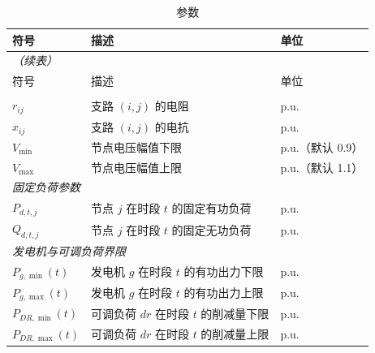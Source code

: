 \documentclass[12pt,a4paper]{article}
\begin{document}
\begin{longtable}{p{3cm}p{6cm}p{4cm}}
\caption{参数}\label{tab:parameters} \\
\toprule
符号 & 描述 & 单位 \\
\midrule
\endfirsthead
\multicolumn{3}{l}{\small\itshape（续表）} \\
\toprule
符号 & 描述 & 单位 \\
\midrule
\endhead
\bottomrule
\endlastfoot
\multicolumn{3}{l}{\textit{网络参数}} \\
\midrule
$r_{ij}$ & 支路 $(i,j)$ 的电阻 & p.u. \\
$x_{ij}$ & 支路 $(i,j)$ 的电抗 & p.u. \\
$V_{\min}$ & 节点电压幅值下限 & p.u.（默认 0.9） \\
$V_{\max}$ & 节点电压幅值上限 & p.u.（默认 1.1） \\
\midrule
\multicolumn{3}{l}{\textit{固定负荷参数}} \\
\midrule
$P_{d,t,j}$ & 节点 $j$ 在时段 $t$ 的固定有功负荷 & p.u. \\
$Q_{d,t,j}$ & 节点 $j$ 在时段 $t$ 的固定无功负荷 & p.u. \\
\midrule
\multicolumn{3}{l}{\textit{发电机与可调负荷界限}} \\
\midrule
$P_{g,\min}(t)$ & 发电机 $g$ 在时段 $t$ 的有功出力下限 & p.u. \\
$P_{g,\max}(t)$ & 发电机 $g$ 在时段 $t$ 的有功出力上限 & p.u. \\
$P_{DR,\min}(t)$ & 可调负荷 $dr$ 在时段 $t$ 的削减量下限 & p.u. \\
$P_{DR,\max}(t)$ & 可调负荷 $dr$ 在时段 $t$ 的削减量上限 & p.u. \\
\end{longtable}
\end{document}
